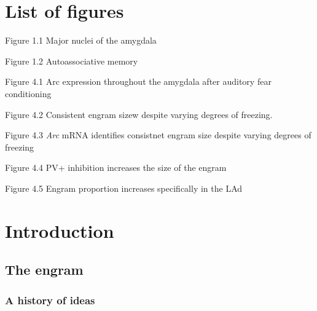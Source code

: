 \documentclass[12pt,a4paper,]{report}
\begin{document}
\newpage

\tableofcontents

\chapter*{List of figures}\label{list-of-figures}

Figure 1.1 Major nuclei of the amygdala 

\noindent
Figure 1.2 Autoassociative memory 

\noindent
Figure 4.1 Arc expression throughout the amygdala after auditory fear
conditioning 

\noindent
Figure 4.2 Consistent engram sizew despite varying degrees of freezing.

\noindent
Figure 4.3 \emph{Arc} mRNA identifies consistnet engram size despite
varying degrees of freezing 

\noindent
Figure 4.4 PV+ inhibition increases the size of the engram 

\noindent
Figure 4.5 Engram proportion increases specifically in the LAd

\chapter{Introduction}\label{introduction}

\section{The engram}\label{the-engram}

\subsection{A history of ideas}\label{a-history-of-ideas}
\end{document}
